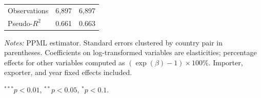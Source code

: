 \begin{table}[htbp]
\begin{tabular}{l cc cc}
\midrule
Observations & \multicolumn{2}{c}{6,897} & \multicolumn{2}{c}{6,897} \\
Pseudo-$R^2$ & \multicolumn{2}{c}{0.661} & \multicolumn{2}{c}{0.663} \\
\bottomrule
\end{tabular}
\par\vspace{4pt}\noindent\begin{minipage}{\textwidth}
\footnotesize
\par \textit{Notes:} PPML estimator. Standard errors clustered by country pair in parentheses. Coefficients on log-transformed variables are elasticities; percentage effects for other variables computed as $(\exp(\beta)-1) \times 100\%$. Importer, exporter, and year fixed effects included.
\par $^{***}p<0.01$, $^{**}p<0.05$, $^{*}p<0.1$.
\end{minipage}
\end{table}

\clearpage


